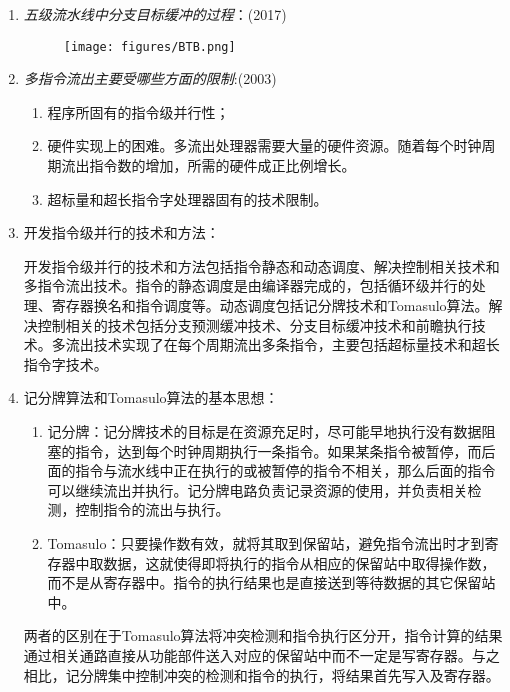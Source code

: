\documentclass[a4paper]{ctexart}
\begin{document}
\begin{enumerate}
  
  \item \emph{五级流水线中分支目标缓冲的过程}：(2017)
  \begin{figure}[!htbp]
    \centering
    \texttt{[image: figures/BTB.png]}
  \end{figure}
  
  \item \emph{多指令流出主要受哪些方面的限制}:(2003)
  \begin{enumerate}
    \item 程序所固有的指令级并行性；
    \item 硬件实现上的困难。多流出处理器需要大量的硬件资源。随着每个时钟周期流出指令数的增加，所需的硬件成正比例增长。
    \item 超标量和超长指令字处理器固有的技术限制。
  \end{enumerate}
  
  \item 开发指令级并行的技术和方法：
  
  开发指令级并行的技术和方法包括指令静态和动态调度、解决控制相关技术和多指令流出技术。指令的静态调度是由编译器完成的，包括循环级并行的处理、寄存器换名和指令调度等。动态调度包括记分牌技术和Tomasulo算法。解决控制相关的技术包括分支预测缓冲技术、分支目标缓冲技术和前瞻执行技术。多流出技术实现了在每个周期流出多条指令，主要包括超标量技术和超长指令字技术。
  
  \item 记分牌算法和Tomasulo算法的基本思想：
  \begin{enumerate}
    \item 记分牌：记分牌技术的目标是在资源充足时，尽可能早地执行没有数据阻塞的指令，达到每个时钟周期执行一条指令。如果某条指令被暂停，而后面的指令与流水线中正在执行的或被暂停的指令不相关，那么后面的指令可以继续流出并执行。记分牌电路负责记录资源的使用，并负责相关检测，控制指令的流出与执行。
    \item Tomasulo：只要操作数有效，就将其取到保留站，避免指令流出时才到寄存器中取数据，这就使得即将执行的指令从相应的保留站中取得操作数，而不是从寄存器中。指令的执行结果也是直接送到等待数据的其它保留站中。
  \end{enumerate}
  两者的区别在于Tomasulo算法将冲突检测和指令执行区分开，指令计算的结果通过相关通路直接从功能部件送入对应的保留站中而不一定是写寄存器。与之相比，记分牌集中控制冲突的检测和指令的执行，将结果首先写入及寄存器。
  

\end{enumerate}
\end{document}
